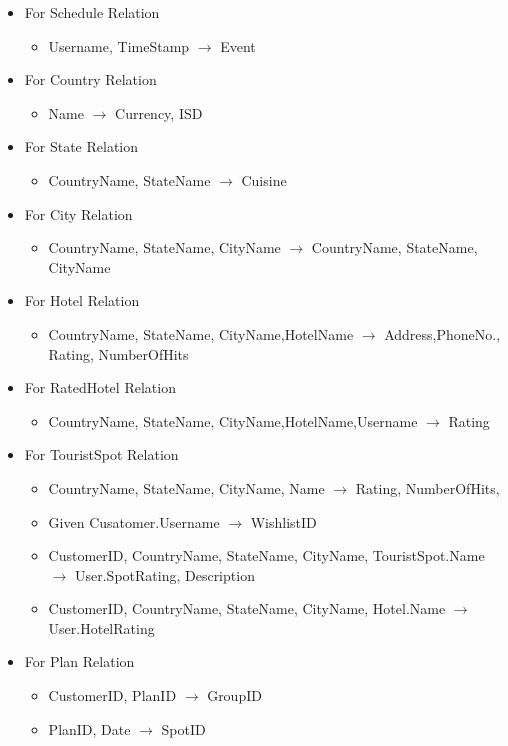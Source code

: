 \documentclass[11pt]{article}
\begin{document}
\begin{itemize}
\item For Schedule Relation
\begin{itemize}
\item Username, TimeStamp $\rightarrow$ Event
\end{itemize}
\item For Country Relation
\begin{itemize}
\item Name $\rightarrow$ Currency, ISD
\end{itemize}
\item For State Relation
\begin{itemize}
\item CountryName, StateName $\rightarrow$ Cuisine
\end{itemize}
\item For City Relation
\begin{itemize}
\item CountryName, StateName, CityName $\rightarrow$ CountryName, StateName, CityName 
\end{itemize}
\item For Hotel Relation
\begin{itemize}
\item CountryName, StateName, CityName,HotelName $\rightarrow$ Address,PhoneNo., Rating, NumberOfHits 
\end{itemize}
\item For RatedHotel Relation
\begin{itemize}
\item CountryName, StateName, CityName,HotelName,Username $\rightarrow$ Rating
\end{itemize}
\item For TouristSpot Relation
\begin{itemize}
\item CountryName, StateName, CityName, Name $\rightarrow$ Rating, NumberOfHits,
\item Given Cusatomer.Username $\rightarrow$ WishlistID
\item CustomerID, CountryName, StateName, CityName, TouristSpot.Name $\rightarrow$ User.SpotRating, Description
\item CustomerID, CountryName, StateName, CityName, Hotel.Name $\rightarrow$ User.HotelRating
\end{itemize}
\item For Plan Relation
\begin{itemize}
\item CustomerID, PlanID $\rightarrow$ GroupID
\item PlanID, Date $\rightarrow$ SpotID
\end{itemize}
\end{itemize}
\end{document}
